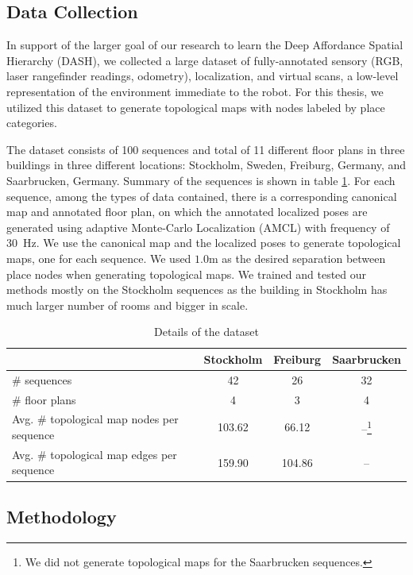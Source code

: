 \documentclass[10pt, titlepage]{article}
\theoremstyle{definition}
\begin{document}
\subsection{Data Collection}\label{section:data}

In support of the larger goal of our research to learn the Deep Affordance Spatial Hierarchy (DASH), we collected a large dataset of fully-annotated sensory (RGB, laser rangefinder readings, odometry), localization, and virtual scans, a low-level representation of the environment immediate to the robot. For this thesis, we utilized this dataset to generate topological maps with nodes labeled by place categories.

The dataset consists of 100 sequences and total of 11 different floor plans in three buildings in three different locations: Stockholm, Sweden, Freiburg, Germany, and Saarbrucken, Germany. Summary of the sequences is shown in table \ref{table:dataset}. For each sequence, among the types of data contained,  there is a corresponding canonical map and annotated floor plan, on which the annotated localized poses are generated using adaptive Monte-Carlo Localization (AMCL) with frequency of 30~Hz. We use the canonical map and the localized poses to generate topological maps, one for each sequence. We used $1.0$m as the desired separation between place nodes when generating topological maps. We trained and tested our methods mostly on the Stockholm sequences as the building in Stockholm has much larger number of rooms and bigger in scale.

\begin{table}[h!]
\centering
 \begin{tabular}{|l|c|c|c|} 
 \hline
  & Stockholm & Freiburg & Saarbrucken \\ [0.5ex] 
 \hline
 \# sequences & 42 & 26 & 32 \\ 
 \hline
 \# floor plans & 4 & 3 & 4 \\
 \hline
 Avg. \# topological map nodes per sequence & 103.62 & 66.12 & --\footnote{We did not generate topological maps for the Saarbrucken sequences.} \\
 \hline
 Avg. \# topological map edges per sequence & 159.90 & 104.86 & -- \\
 \hline
 \end{tabular}
 \caption{Details of the dataset}
 \label{table:dataset}
\end{table}

\subsection{Methodology}\label{section:method}
\end{document}
